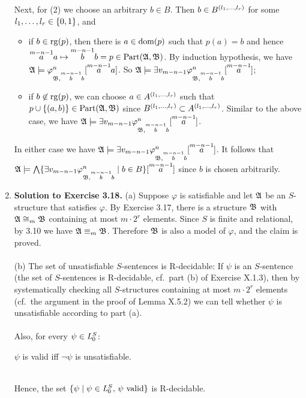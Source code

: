 \begin{enumerate}[1.]
Next, for (2) we choose an arbitrary $b \in B$. Then $b \in B^{\tuple{\seq[1]{l}{r}}}$ for some $\seq[1]{l}{r} \in \{ 0, 1 \}$, and
\begin{itemize}
\item if $b \in \rg{p}$, then there is $a \in \dom{p}$ such that $p(a) = b$ and hence $\vect{a}{m - n - 1}a \mapsto \vect{b}{m - n - 1}b = p \in \partism{\struct{A}}{\struct{B}}$. By induction hypothesis, we have $\struct{A} \models \varphi^n_{\struct{B}, \vect{b}{m - n - 1}b}[\vect{a}{m - n - 1}a]$. So $\struct{A} \models \exists v_{m - n - 1} \varphi^n_{\struct{B}, \vect{b}{m - n - 1}b}[\vect{a}{m - n - 1}]$;
\item if $b \not\in \rg{p}$, we can choose $a \in A^{\tuple{\seq[1]{l}{r}}}$ such that $p \cup \{ (a, b) \} \in \partism{\struct{A}}{\struct{B}}$ since $B^{\tuple{\seq[1]{l}{r}}} \subset A^{\tuple{\seq[1]{l}{r}}}$. Similar to the above case, we have 
$\struct{A} \models \exists v_{m - n - 1} \varphi^n_{\struct{B}, \vect{b}{m - n - 1}b}[\vect{a}{m - n - 1}]$.
\end{itemize}
In either case we have $\struct{A} \models \exists v_{m - n - 1} \varphi^n_{\struct{B}, \vect{b}{m - n - 1}b}[\vect{a}{m - n - 1}]$. It follows that $\struct{A} \models \bigwedge \setm{\exists v_{m - n - 1} \varphi^n_{\struct{B}, \vect{b}{m - n - 1}b}}{b \in B}[\vect{a}{m - n - 1}]$ since $b$ is chosen arbitrarily.
%
\item \textbf{Solution to Exercise 3.18.} (a) Suppose $\varphi$ is satisfiable and let $\struct{A}$ be an $S$-structure that satisfies $\varphi$. By Exercise 3.17, there is a structure $\struct{B}$ with $\struct{A} \iso_m \struct{B}$ containing at most $m \cdot 2^r$ elements. Since $S$ is finite and relational, by 3.10 we have $\struct{A} \equiv_m \struct{B}$. Therefore $\struct{B}$ is also a model of $\varphi$, and the claim is proved.\\
\ \\
(b) The set of unsatisfiable $S$-sentences is R-decidable: If $\psi$ is an $S$-sentence (the set of $S$-sentences is R-decidable, cf.\ part (b) of Exercise X.1.3), then by systematically checking all $S$-structures containing at most $m \cdot 2^r$ elements (cf.\ the argument in the proof of Lemma X.5.2) we can tell whether $\psi$ is unsatisfiable according to part (a).\\
\ \\
Also, for every $\psi \in \fstordlang[0]{S}$:\\
\centerline{$\psi$ is valid \quad iff \quad $\neg\psi$ is unsatisfiable.}\\
Hence, the set $\sett{\psi}{\(\psi \in \fstordlang[0]{S}\), \(\psi\) valid}$ is R-decidable.
\end{enumerate}
